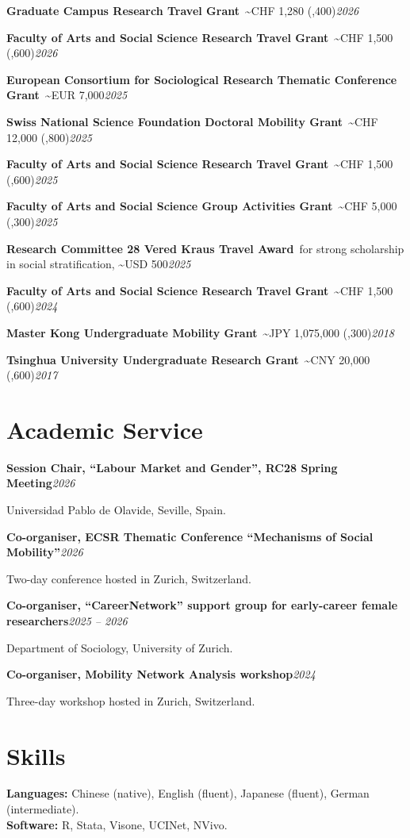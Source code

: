 \documentclass[11pt,a4paper]{article}
\newcommand{\entrynodetail}[2]{%
    \noindent\textbf{#1}\hfill\textit{\color{lighttext}#2}\par\vspace{0.1em}
}
\newcommand{\award}[3]{%
    \noindent\textbf{#1}\ {\small\color{lighttext}#2}\hfill\textit{\color{lighttext}#3}\par\vspace{0.05em}
}
\begin{document}
\award{Graduate Campus Research Travel Grant}{\textasciitilde CHF 1,280 (,400)}{2026}
\vspace{0.3em}
\award{Faculty of Arts and Social Science Research Travel Grant}{\textasciitilde CHF 1,500 (\texteuro 1,600)}{2026}
\vspace{0.3em}
\award{European Consortium for Sociological Research Thematic Conference Grant}{\textasciitilde EUR 7,000}{2025}
\vspace{0.3em}
\award{Swiss National Science Foundation Doctoral Mobility Grant}{\textasciitilde CHF 12,000 (2,800)}{2025}
\vspace{0.3em}
\award{Faculty of Arts and Social Science Research Travel Grant}{\textasciitilde CHF 1,500 (\texteuro 1,600)}{2025}
\vspace{0.3em}
\award{Faculty of Arts and Social Science Group Activities Grant}{\textasciitilde CHF 5,000 (\texteuro 5,300)}{2025}
\vspace{0.3em}
\award{Research Committee 28 Vered Kraus Travel Award}{for strong scholarship in social stratification, \textasciitilde USD 500}{2025}

\vspace{0.3em}
\award{Faculty of Arts and Social Science Research Travel Grant}{\textasciitilde CHF 1,500 (\texteuro 1,600)}{2024}
\vspace{0.3em}
\award{Master Kong Undergraduate Mobility Grant}{\textasciitilde JPY 1,075,000 (\texteuro 8,300)}{2018}
\vspace{0.3em}
\award{Tsinghua University Undergraduate Research Grant}{\textasciitilde CNY 20,000 (\texteuro 2,600)}{2017}

\section{Academic Service}

\entrynodetail{Session Chair, ``Labour Market and Gender'', RC28 Spring Meeting}{2026}
{\small\color{lighttext} Universidad Pablo de Olavide, Seville, Spain.}

\vspace{0.3em}
\entrynodetail{Co-organiser, ECSR Thematic Conference ``Mechanisms of Social Mobility''}{2026}
{\small\color{lighttext} Two-day conference hosted in Zurich, Switzerland.}

\vspace{0.3em}
\entrynodetail{Co-organiser, ``CareerNetwork'' support group for early-career female researchers}{2025 -- 2026}
{\small\color{lighttext} Department of Sociology, University of Zurich.}

\vspace{0.3em}
\entrynodetail{Co-organiser, Mobility Network Analysis workshop}{2024}
{\small\color{lighttext} Three-day workshop hosted in Zurich, Switzerland.}

\section{Skills}

\textbf{Languages:} Chinese (native), English (fluent), Japanese (fluent), German (intermediate).\\[0.3em]
\textbf{Software:} R, Stata, Visone, UCINet, NVivo.
\end{document}
